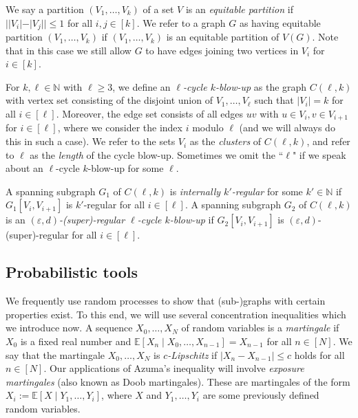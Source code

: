 \documentclass[a4paper, 11pt, reqno]{amsart}
\numberwithin{equation}{section}
\newcommand{\1}{{\rm 1\hspace*{-0.4ex}%
\rule{0.1ex}{1.52ex}\hspace*{0.2ex}}}
\newcommand{\N}{\mathbb N}
\renewcommand{\epsilon}{\varepsilon}
\newcommand{\sub}{\subseteq}
\begin{document}
We say a partition $(V_1,\dots, V_k)$ of a set $V$ is an {\em equitable partition} if $||V_i|-|V_j||\leq 1$ for all $i,j \in [k]$.
We refer to a graph $G$ as having equitable partition $(V_1,\dots, V_k)$
if $(V_1,\dots, V_k)$ is an equitable partition of $V(G)$.
Note that in this case we still allow $G$ to have edges joining two vertices in $V_i$ for $i\in [k]$.


For $k,\ell\in\N$ with $\ell\geq 3$,
we define an \emph{$\ell$-cycle $k$-blow-up} as the graph $C(\ell,k)$ with 
vertex set consisting of the disjoint union of $V_1,\ldots,V_\ell$ such that $|V_i|=k$ for all $i\in [\ell]$.
Moreover, the edge set consists of all edges $uv$
with $u\in V_i,v\in V_{i+1}$ for $i\in [\ell]$, where we consider the index $i$ modulo $\ell$ (and we will always do this in such a case).
We refer to the sets $V_i$ as the \emph{clusters} of $C(\ell,k)$, 
and refer to $\ell$ as the {\em length} of the cycle blow-up.
Sometimes we omit the ``$\ell$" if we speak about an $\ell$-cycle $k$-blow-up for some $\ell$.

A spanning subgraph $G_1$ of $C(\ell,k)$ is \emph{internally $k'$-regular} for some $k'\in \N$ if $G_1[V_i,V_{i+1}]$ is $k'$-regular for all $i \in [\ell]$.
A spanning subgraph $G_2$ of $C(\ell,k)$ is an \emph{$(\epsilon,d)$-(super)-regular $\ell$-cycle $k$-blow-up}
if $G_2[V_i,V_{i+1}]$ is $(\epsilon,d)$-(super)-regular for all $i\in [\ell]$.





\subsection{Probabilistic tools}
We frequently use random processes to show that (sub-)graphs with certain properties exist.
To this end, we will use several concentration inequalities which we introduce now.
A sequence $X_0,\dots, X_N$ of random variables is a {\em martingale} 
if $X_0$ is a fixed real number and $\mathbb{E}[X_{n}\mid X_0,\dots,X_{n-1}] = X_{n-1}$ for all $n\in [N]$. 
We say that the martingale $X_0,\dots, X_N$ is {\em $c$-Lipschitz} if $|X_{n}-X_{n-1}| \leq c$ holds for all $n\in[N]$. 
Our applications of Azuma's inequality will involve \emph{exposure martingales} (also known as Doob martingales). These are martingales of the form $X_i:=\mathbb{E}[X\mid Y_1,\dots, Y_i]$, where $X$ and $Y_1,\dots,Y_i$ are some previously defined random variables.
\end{document}
